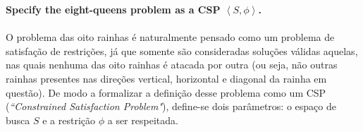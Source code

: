 \documentclass{report}
\begin{document}
\textbf{Specify the eight-queens problem as a CSP $\left<S,\phi\right>$.}\\

\paragraph{} O problema das oito rainhas é naturalmente pensado como um problema de satisfação de restrições, já que somente são consideradas soluções válidas aquelas, nas quais nenhuma das oito rainhas é atacada por outra (ou seja, não outras rainhas presentes nas direções vertical, horizontal e diagonal da rainha em questão). De modo a formalizar a definição desse problema como um CSP (\textit{``Constrained Satisfaction Problem"}), define-se dois parâmetros: o espaço de busca $S$ e a restrição $\phi$ a ser respeitada.\\
\end{document}
